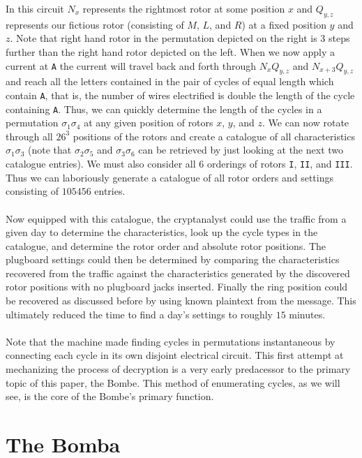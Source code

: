 In this circuit $N_x$ represents the rightmost rotor at some position $x$ and $Q_{y,z}$ represents our fictious rotor (consisting of $M$, $L$, and $R$) at a fixed position $y$ and $z$. Note that right hand rotor in the permutation depicted on the right is 3 steps further than the right hand rotor depicted on the left. When we now apply a current at \texttt{A} the current will travel back and forth through $N_xQ_{y,z}$ and $N_{x+3}Q_{y,z}$ and reach all the letters contained in the pair of cycles of equal length which contain \texttt{A}, that is, the number of wires electrified is double the length of the cycle containing \texttt{A}. Thus, we can quickly determine the length of the cycles in a permutation $\sigma_1\sigma_{4}$ at any given position of rotors ${x}$, $y$, and $z$. We can now rotate through all $26^3$ positions of the rotors and create a catalogue of all characteristics $\sigma_1\sigma_3$ (note that $\sigma_2\sigma_5$ and $\sigma_3\sigma_6$ can be retrieved by just looking at the next two catalogue entries). We must also consider all 6 orderings of rotors \texttt{I}, \texttt{II}, and \texttt{III}. Thus we can laboriously generate a catalogue of all rotor orders and settings consisting of $105456$ entries.
\\\\Now equipped with this catalogue, the cryptanalyst could use the traffic from a given day to determine the characteristics, look up the cycle types in the catalogue, and determine the rotor order and absolute rotor positions. The plugboard settings could then be determined by comparing the characteristics recovered from the traffic against the characteristics generated by the discovered rotor positions with no plugboard jacks inserted. Finally the ring position could be recovered as discussed before by using known plaintext from the message. This ultimately reduced the time to find a day's settings to roughly $15$ minutes.
\\\\Note that the machine made finding cycles in permutations instantaneous by connecting each cycle in its own disjoint electrical circuit. This first attempt at mechanizing the process of decryption is a very early predacessor to the primary topic of this paper, the Bombe. This method of enumerating cycles, as we will see, is the core of the Bombe's primary function.
\section{The Bomba}

